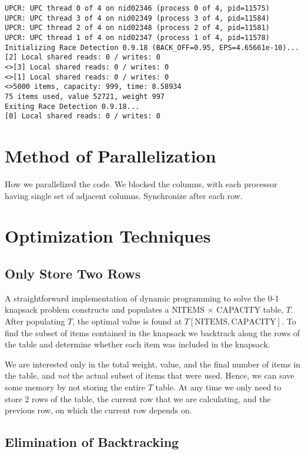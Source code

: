 \documentclass[11pt]{article} %
\begin{document}
{\tiny
\begin{lstlisting}
UPCR: UPC thread 0 of 4 on nid02346 (process 0 of 4, pid=11575)
UPCR: UPC thread 3 of 4 on nid02349 (process 3 of 4, pid=11584)
UPCR: UPC thread 2 of 4 on nid02348 (process 2 of 4, pid=11581)
UPCR: UPC thread 1 of 4 on nid02347 (process 1 of 4, pid=11578)
Initializing Race Detection 0.9.18 (BACK_OFF=0.95, EPS=4.65661e-10)...
[2] Local shared reads: 0 / writes: 0
<>[3] Local shared reads: 0 / writes: 0
<>[1] Local shared reads: 0 / writes: 0
<>5000 items, capacity: 999, time: 8.58934
75 items used, value 52721, weight 997
Exiting Race Detection 0.9.18...
[0] Local shared reads: 0 / writes: 0
\end{lstlisting}
}

\section{Method of Parallelization}

How we parallelized the code. We blocked the columns, with each processor having single set of adjacent columns. Synchronize after each row.

\section{Optimization Techniques}

\subsection{Only Store Two Rows}
A straightforward implementation of dynamic programming to solve the 0-1 knapsack problem constructs and populates a NITEMS $\times$ CAPACITY table, $T$. After populating $T$, the optimal value is found at $T[\text{NITEMS}, \text{CAPACITY}]$. To find the subset of items contained in the knapsack we backtrack along the rows of the table and determine whether each item was included in the knapsack. 

We are interested only in the total weight, value, and the final number of items in the table, and \emph{not} the actual subset of items that were used. Hence, we can save some memory by not storing the entire $T$ table. At any time we only need to store 2 rows of the table, the current row that we are calculating, and the previous row, on which the current row depends on.

\subsection{Elimination of Backtracking}
\end{document}
